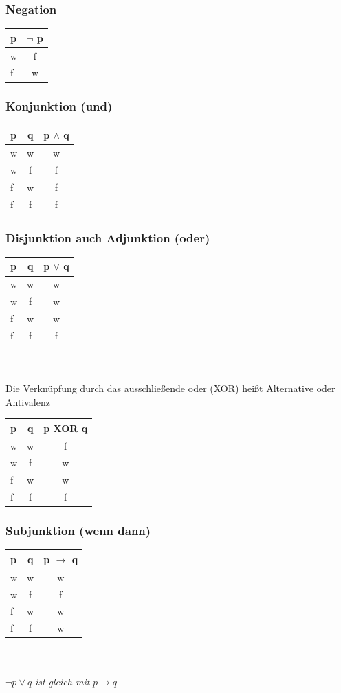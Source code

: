 \documentclass[a4paper,12pt]{scrartcl}
\begin{document}
\subsubsection{Negation}
\begin{tabular}{l|c}
  p & $\neg$ p\\
  \hline
  w & f \\
  f & w \\
\end{tabular}

\subsubsection{Konjunktion (und)}
\begin{tabular}{lc|c}
  p & q & p $\land$ q\\
  \hline
  w & w & w \\
  w & f & f \\
  f & w & f \\
  f & f & f \\
\end{tabular}

\subsubsection{Disjunktion auch Adjunktion (oder)}
\begin{tabular}{lc|c}
  p & q & p $\vee$ q\\
  \hline
  w & w & w \\
  w & f & w \\
  f & w & w \\
  f & f & f \\
\end{tabular}
\\ 
\\ Die Verknüpfung durch das ausschließende oder (XOR) heißt Alternative oder Antivalenz \\

\begin{tabular}{lc|c}
  p & q & p XOR q\\
  \hline
  w & w & f \\
  w & f & w \\
  f & w & w \\
  f & f & f \\
\end{tabular}

\subsubsection{Subjunktion (wenn dann)}
\begin{tabular}{lc|c}
  p & q & p $\to$ q\\
  \hline
  w & w & w \\
  w & f & f \\
  f & w & w \\
  f & f & w \\
\end{tabular}
\\
\\ $\neg p \vee q$ \textit{ist gleich mit} $p \to q$
\end{document}
